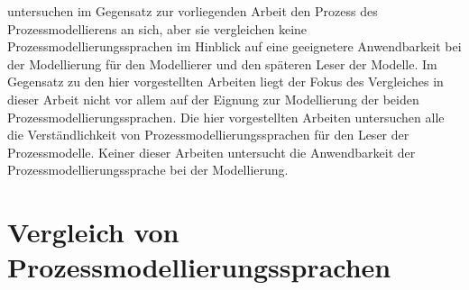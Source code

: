 \cite{pinggera2012tracing, forster2012collaborative, pinggera2010investigating} untersuchen im Gegensatz zur vorliegenden Arbeit den Prozess des Prozessmodellierens an sich, aber sie vergleichen keine Prozessmodellierungssprachen im Hinblick auf eine geeignetere Anwendbarkeit bei der Modellierung für den Modellierer und den späteren Leser der Modelle.\newline
Im Gegensatz zu den hier vorgestellten Arbeiten liegt der Fokus des Vergleiches in dieser Arbeit nicht vor allem auf der Eignung zur Modellierung der beiden Prozessmodellierungssprachen. Die hier vorgestellten Arbeiten untersuchen alle die Verständlichkeit von Prozessmodellierungssprachen für den Leser der Prozessmodelle. Keiner dieser Arbeiten untersucht die Anwendbarkeit der Prozessmodellierungssprache bei der Modellierung. \newline


\section{Vergleich von Prozessmodellierungssprachen}

